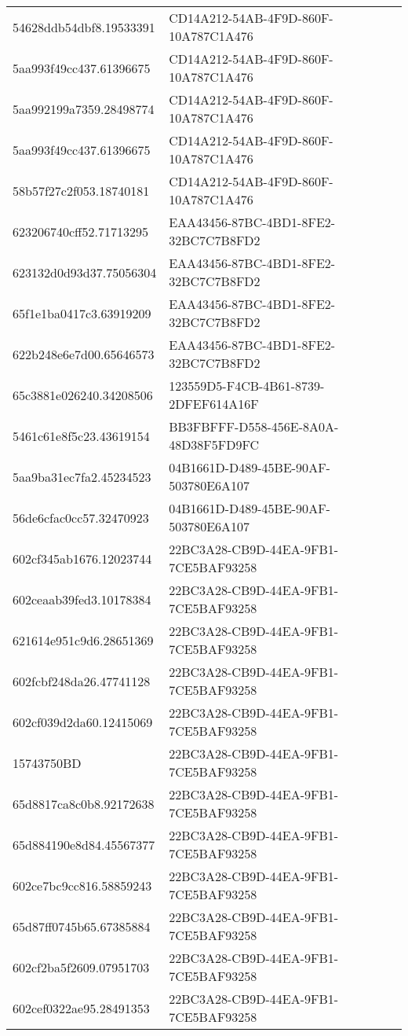 \begin{tabular}{ll}
54628ddb54dbf8.19533391 & CD14A212-54AB-4F9D-860F-10A787C1A476 \\
5aa993f49cc437.61396675 & CD14A212-54AB-4F9D-860F-10A787C1A476 \\
5aa992199a7359.28498774 & CD14A212-54AB-4F9D-860F-10A787C1A476 \\
5aa993f49cc437.61396675 & CD14A212-54AB-4F9D-860F-10A787C1A476 \\
58b57f27c2f053.18740181 & CD14A212-54AB-4F9D-860F-10A787C1A476 \\
623206740cff52.71713295 & EAA43456-87BC-4BD1-8FE2-32BC7C7B8FD2 \\
623132d0d93d37.75056304 & EAA43456-87BC-4BD1-8FE2-32BC7C7B8FD2 \\
65f1e1ba0417c3.63919209 & EAA43456-87BC-4BD1-8FE2-32BC7C7B8FD2 \\
622b248e6e7d00.65646573 & EAA43456-87BC-4BD1-8FE2-32BC7C7B8FD2 \\
65c3881e026240.34208506 & 123559D5-F4CB-4B61-8739-2DFEF614A16F \\
5461c61e8f5c23.43619154 & BB3FBFFF-D558-456E-8A0A-48D38F5FD9FC \\
5aa9ba31ec7fa2.45234523 & 04B1661D-D489-45BE-90AF-503780E6A107 \\
56de6cfac0cc57.32470923 & 04B1661D-D489-45BE-90AF-503780E6A107 \\
602cf345ab1676.12023744 & 22BC3A28-CB9D-44EA-9FB1-7CE5BAF93258 \\
602ceaab39fed3.10178384 & 22BC3A28-CB9D-44EA-9FB1-7CE5BAF93258 \\
621614e951c9d6.28651369 & 22BC3A28-CB9D-44EA-9FB1-7CE5BAF93258 \\
602fcbf248da26.47741128 & 22BC3A28-CB9D-44EA-9FB1-7CE5BAF93258 \\
602cf039d2da60.12415069 & 22BC3A28-CB9D-44EA-9FB1-7CE5BAF93258 \\
15743750BD & 22BC3A28-CB9D-44EA-9FB1-7CE5BAF93258 \\
65d8817ca8c0b8.92172638 & 22BC3A28-CB9D-44EA-9FB1-7CE5BAF93258 \\
65d884190e8d84.45567377 & 22BC3A28-CB9D-44EA-9FB1-7CE5BAF93258 \\
602ce7bc9cc816.58859243 & 22BC3A28-CB9D-44EA-9FB1-7CE5BAF93258 \\
65d87ff0745b65.67385884 & 22BC3A28-CB9D-44EA-9FB1-7CE5BAF93258 \\
602cf2ba5f2609.07951703 & 22BC3A28-CB9D-44EA-9FB1-7CE5BAF93258 \\
602cef0322ae95.28491353 & 22BC3A28-CB9D-44EA-9FB1-7CE5BAF93258 \\

\end{tabular}
